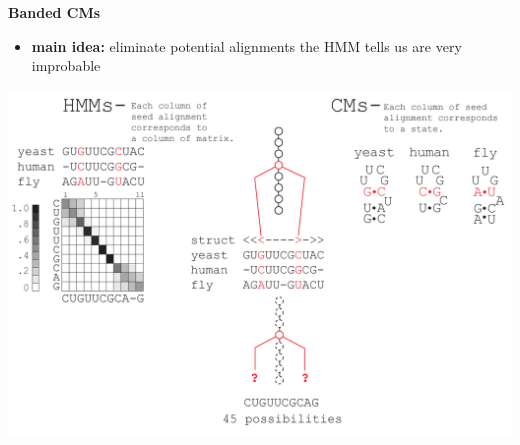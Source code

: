 \documentclass[landscape]{slides}
\begin{document}
\begin{slide}
\begin{center}
\large
\textbf{Banded CMs}
\end{center}
\medskip
\small
\begin{itemize}
\item
\textbf{main idea:} eliminate potential alignments the HMM tells us are very improbable
\end{itemize}
\begin{center}
\includegraphics[width=8in]{figs/post_hmm_to_cm_map2_layer14}
\end{center}
\vfill
\end{slide}
\end{document}
